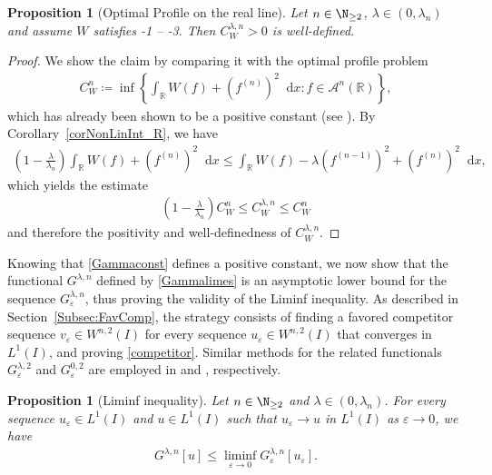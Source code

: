 \documentclass{article}
\newcommand{\dd}{\mathop{}\mathrm{d}} %
\newcommand{\lam}{\lambda}
\newcommand{\eps}{\varepsilon}
\numberwithin{figure}{section}
\def\AAA{{\mathcal A}} \def\calB{{\mathcal B}} \def\calC{{\mathcal C}}
\newcommand{\R}{\mathbb{R}}
\newtheorem{prop}[theorem]{Proposition}
\numberwithin{equation}{section}
\begin{document}
\begin{prop}[Optimal Profile on the real line] \label{constwohl}
    Let $n \in \N_{\geq2}$, $\lam \in (0,\lam_n)$ and assume $W$ satisfies \hyp1 -- \hyp3. Then $C^{\lam,n}_W > 0$ is well-defined.
\end{prop}
\begin{proof}
     We show the claim by comparing it with the optimal profile problem
    \begin{align}
        C_W^n \coloneq \inf\left\{\int_\R W(f) + (f^{(n)})^2\dd x : f \in \AAA^n(\R) \right\},
    \end{align}
    which has already been shown to be a positive constant (see \cite[Section~4]{BruDonSol}). By Corollary~\ref{corNonLinInt_R}, we have
    \begin{align}
        \left(1-\frac{\lam}{\lam_n}\right) \int_{\R} W(f) +(f^{(n)})^2\dd x
        \leq \int_{\R} W(f) - \lam (f^{(n-1)})^2 + (f^{(n)})^2\dd x,
    \end{align}
    which yields the estimate 
    \begin{align}
        \left(1-\frac{\lam}{\lam_n}\right) C^n_W \leq C_W^{\lam,n} \leq C^n_W
    \end{align}
    and therefore the positivity and well-definedness of $C_W^{\lam,n}$.
\end{proof}

 Knowing that \eqref{Gammaconst} defines a positive constant, we now show that the functional $G^{\lam,n}$ defined by \eqref{Gammalimes} is an asymptotic lower bound for the sequence $G^{\lam,n}_\eps$, thus proving the validity of the Liminf inequality. As described in Section~\ref{Subsec:FavComp}, the strategy consists of finding a favored competitor sequence $v_\eps \in W^{n,2}(I)$ for every sequence $u_\eps \in W^{n,2}(I)$ that converges in $L^1(I)$, and proving \eqref{competitor}. Similar methods for the related functionals $G^{\lam,2}_\eps$ and $G^{0,2}_\eps$ are employed in \cite[Theorem~4.1]{CicSpaZep} and \cite[Proposition~2.7]{FonMan}, respectively.

\begin{prop}[Liminf inequality] \label{prop:liminf_inequality}
    Let $n \in \N_{\geq2}$ and $\lam \in (0,\lam_n)$. For every sequence ${u_\eps \in L^1(I)}$ and $u\in L^1(I)$ such that $u_\eps \to u$ in $L^1(I)$ as $\eps \to 0$, we have
    \begin{align}
        G^{\lam,n}[u] \leq \liminf_{\eps \to 0} G^{\lam,n}_\eps[u_\eps].
    \end{align}
\end{prop}
\end{document}
